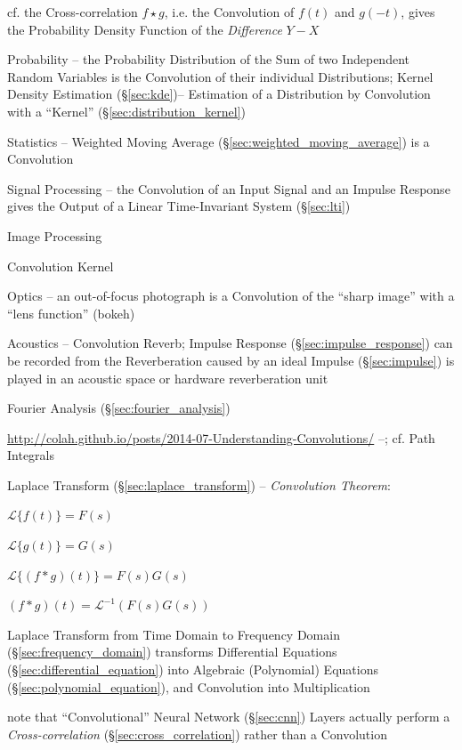 cf. the Cross-correlation $f \star g$, i.e. the Convolution of $f(t)$ and
$g(-t)$, gives the Probability Density Function of the \emph{Difference} $Y - X$

Probability -- the Probability Distribution of the Sum of two Independent Random
Variables is the Convolution of their individual Distributions; Kernel Density
Estimation (\S\ref{sec:kde})-- Estimation of a Distribution by Convolution with
a ``Kernel'' (\S\ref{sec:distribution_kernel})

Statistics -- Weighted Moving Average (\S\ref{sec:weighted_moving_average}) is a
Convolution

Signal Processing -- the Convolution of an Input Signal and an Impulse Response
gives the Output of a Linear Time-Invariant System (\S\ref{sec:lti})

Image Processing

Convolution Kernel

Optics -- an out-of-focus photograph is a Convolution of the ``sharp image''
with a ``lens function'' (bokeh)

Acoustics -- Convolution Reverb; Impulse Response (\S\ref{sec:impulse_response})
can be recorded from the Reverberation caused by an ideal Impulse
(\S\ref{sec:impulse}) is played in an acoustic space or hardware reverberation
unit

\fist Fourier Analysis (\S\ref{sec:fourier_analysis})

\url{http://colah.github.io/posts/2014-07-Understanding-Convolutions/} --; cf.
Path Integrals

\asterism

Laplace Transform (\S\ref{sec:laplace_transform}) -- \emph{Convolution Theorem}:

$\mathcal{L}\{f(t)\} = F(s)$

$\mathcal{L}\{g(t)\} = G(s)$

$\mathcal{L}\{(f * g)(t)\} = F(s)G(s)$

$(f*g)(t) = \mathcal{L}^{-1}(F(s)G(s))$

Laplace Transform from Time Domain to Frequency Domain
(\S\ref{sec:frequency_domain}) transforms Differential Equations
(\S\ref{sec:differential_equation}) into Algebraic (Polynomial) Equations
(\S\ref{sec:polynomial_equation}), and Convolution into Multiplication

\fist note that ``Convolutional'' Neural Network (\S\ref{sec:cnn}) Layers
actually perform a \emph{Cross-correlation} (\S\ref{sec:cross_correlation})
rather than a Convolution



